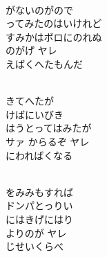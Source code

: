 \documentclass[10pt,b5j]{tarticle} %
\begin{document}
\vspace{1.5em} %
\newcommand{\linespace}{0.5em} %
\newcommand{\blocksize}{0.5\hsize} %
\newcommand{\itemmargin}{3em} %
\begin{enumerate} %
    \setlength{\itemindent}{\itemmargin} %
    \begin{minipage}[c]{\blocksize}
    
        \vspace{\linespace}
        \item~\\
        がないのがので\\
        ってみたのはいけれど\\
        すみかはボロにのれぬ\\
        のがげ ヤレ\\
        えばくへたもんだ
        
        \vspace{\linespace}
        \item~\\
        きてへたが\\
        けばにいびき\\
        はうとってはみたが\\
        サァ からるぞ ヤレ\\
        にわればくなる
        
    \end{minipage}
    \begin{minipage}[c]{\blocksize}
        
        \vspace{\linespace}
        \item~\\
        をみみもすれば\\
        ドンパとっりい\\
        にはきげにはり\\
        よりのが ヤレ\\
        じせいくらべ
        

\end{minipage}
\end{enumerate}
\end{document}
